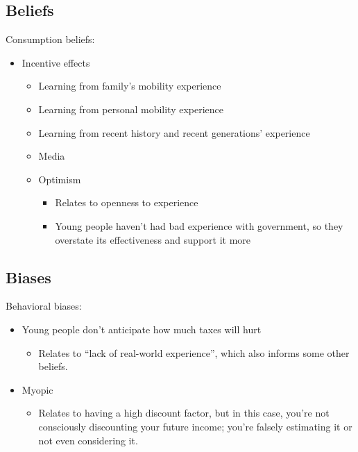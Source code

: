 \documentclass[12pt]{article}
\begin{document}
    \subsection*{Beliefs}
    
    Consumption beliefs:
    \begin{itemize}
        \item Incentive effects
        \begin{itemize}
            \item Learning from family's mobility experience
            \item Learning from personal mobility experience
            \item Learning from recent history and recent generations' experience
            \item Media
            \item Optimism
            \begin{itemize}
                \item Relates to openness to experience
                \item Young people haven't had bad experience with government, so they overstate its effectiveness and support it more
            \end{itemize}
        \end{itemize}
    \end{itemize}

    \subsection*{Biases}

    Behavioral biases:
    \begin{itemize}
        \item Young people don't anticipate how much taxes will hurt
        \begin{itemize}
            \item Relates to ``lack of real-world experience'', which also informs some other beliefs.
        \end{itemize}
        \item Myopic
        \begin{itemize}
            \item Relates to having a high discount factor, but in this case, you're not consciously discounting your future income; you're falsely estimating it or not even considering it.
        \end{itemize}
    \end{itemize}

    
\end{document}
